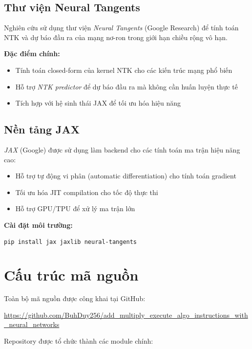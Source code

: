 \subsection{Thư viện Neural Tangents}

Nghiên cứu sử dụng thư viện \textit{Neural Tangents} (Google Research) để tính toán NTK và dự báo đầu ra của mạng nơ-ron trong giới hạn chiều rộng vô hạn.

\textbf{Đặc điểm chính:}
\begin{itemize}
    \item Tính toán closed-form của kernel NTK cho các kiến trúc mạng phổ biến
    \item Hỗ trợ \textit{NTK predictor} để dự báo đầu ra mà không cần huấn luyện thực tế
    \item Tích hợp với hệ sinh thái JAX để tối ưu hóa hiệu năng
\end{itemize}

\subsection{Nền tảng JAX}

\textit{JAX} (Google) được sử dụng làm backend cho các tính toán ma trận hiệu năng cao:
\begin{itemize}
    \item Hỗ trợ tự động vi phân (automatic differentiation) cho tính toán gradient
    \item Tối ưu hóa JIT compilation cho tốc độ thực thi
    \item Hỗ trợ GPU/TPU để xử lý ma trận lớn
\end{itemize}

\textbf{Cài đặt môi trường:}
\begin{lstlisting}
pip install jax jaxlib neural-tangents
\end{lstlisting}

\section{Cấu trúc mã nguồn}

Toàn bộ mã nguồn được công khai tại GitHub:

\begin{center}
\url{https://github.com/BuhDuy256/add_multiply_execute_algo_instructions_with_neural_networks}
\end{center}

Repository được tổ chức thành các module chính:

